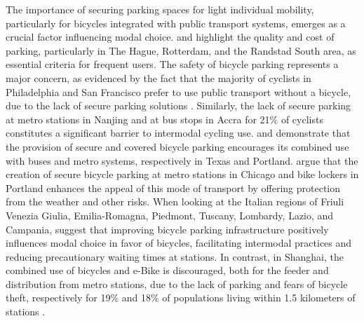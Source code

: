 \begin{refsegment}
The importance of securing parking spaces for light individual mobility, particularly for bicycles integrated with public transport systems, emerges as a crucial factor influencing modal choice. \textcolor{blue}{\textcite[489]{la_paix_puello_role_2021}} and \textcolor{blue}{\textcite[47]{la_paix_puello_modelling_2015}} highlight the quality and cost of parking, particularly in The Hague, Rotterdam, and the Randstad South area, as essential criteria for frequent users. The safety of bicycle parking represents a major concern, as evidenced by the fact that the majority of cyclists in Philadelphia and San Francisco prefer to use public transport without a bicycle, due to the lack of secure parking solutions \textcolor{blue}{\autocite[106]{flamm_public_2014}}. Similarly, the lack of secure parking at metro stations in Nanjing \textcolor{blue}{\autocite[191]{yang_metro_2015}} and at bus stops in Accra for 21\% of cyclists \textcolor{blue}{\autocite[112]{quarshie_integrating_2007}} constitutes a significant barrier to intermodal cycling use. \textcolor{blue}{\textcite[89]{taylor_analysis_1996}} and \textcolor{blue}{\textcite[99-101]{singleton_exploring_2014}} demonstrate that the provision of secure and covered bicycle parking encourages its combined use with buses and metro systems, respectively in Texas and Portland. \textcolor{blue}{\textcite[165]{krizek_assessing_2011}} argue that the creation of secure bicycle parking at metro stations in Chicago and bike lockers in Portland enhances the appeal of this mode of transport by offering protection from the weather and other risks. When looking at the Italian regions of Friuli Venezia Giulia, Emilia-Romagna, Piedmont, Tuscany, Lombardy, Lazio, and Campania, \textcolor{blue}{\textcite[8]{giansoldati_train-feeder_2021}} suggest that improving bicycle parking infrastructure positively influences modal choice in favor of bicycles, facilitating intermodal practices and reducing precautionary waiting times at stations. In contrast, in Shanghai, the combined use of bicycles and \acrshort{e-Bike} is discouraged, both for the feeder and distribution from metro stations, due to the lack of parking and fears of bicycle theft, respectively for 19\% and 18\% of populations living within 1.5 kilometers of stations \textcolor{blue}{\autocite[188]{pan_intermodal_2010}}.%


\end{refsegment}
